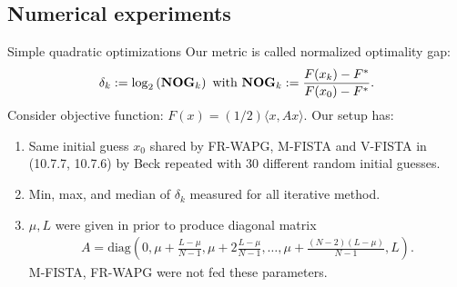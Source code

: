 \documentclass[11pt]{beamer}
\theoremstyle{definition}
\begin{document}
    \subsection{Numerical experiments}
        \begin{frame}{Simple quadratic optimizations}
            Our metric is called normalized optimality gap: 
            \newcommand{\NOG}{\text{\textbf{NOG}}}
            {\footnotesize
            \begin{align*}
                \delta_k := \log_2\left(
                    \NOG_k
                \right)
                \text{ with } 
                \NOG_k := \frac{F(x_k) - F^*}{F(x_0) - F^*}.
            \end{align*}
            }
            Consider objective function: $F(x) = (1/2)\langle x, A x\rangle$. 
            Our setup has: 
            \begin{enumerate}
                \item Same initial guess $x_0$ shared by FR-WAPG,  M-FISTA and V-FISTA in (10.7.7, 10.7.6) by Beck \cite{beck_first-order_2017} repeated with 30 different random initial guesses. 
                \item Min, max, and median of $\delta_k$ measured for all iterative method.
                \item $\mu, L$ were given in prior to produce diagonal matrix 
                {\footnotesize
                \begin{align*}
                    A = \text{diag}
                    \left(0, 
                        \mu + \frac{L - \mu}{N - 1},
                        \mu + 2\frac{L - \mu}{N - 1}, 
                        \ldots, 
                        \mu + \frac{(N - 2)(L - \mu)}{N - 1}, 
                        L
                    \right). 
                \end{align*}
                }
                M-FISTA, FR-WAPG were not fed these parameters. 
            \end{enumerate}
        \end{frame}
\end{document}
